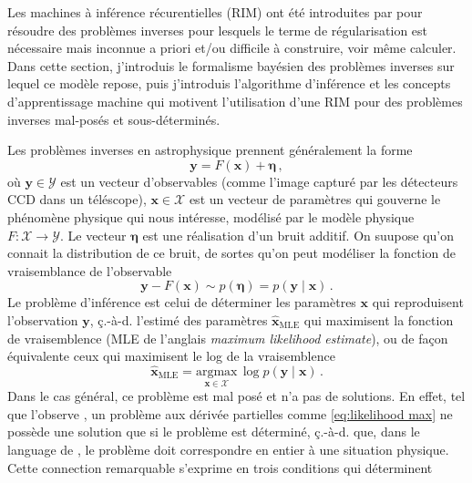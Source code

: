 Les machines à inférence récurentielles (RIM) ont été introduites par \citet{Putzky2017} pour résoudre des problèmes 
inverses pour lesquels le terme de régularisation est nécessaire mais inconnue a priori et/ou difficile à 
construire, voir même calculer. Dans cette section, j'introduis le formalisme bayésien des problèmes inverses sur lequel 
ce modèle repose, puis j'introduis l'algorithme d'inférence et les concepts d'apprentissage machine qui motivent 
l'utilisation d'une RIM pour des problèmes inverses mal-posés et sous-déterminés.

Les problèmes inverses en astrophysique prennent généralement la forme
\begin{equation}\label{eq:inverse problem lineaire}
       \mathbf{y} = F(\mathbf{x}) + \boldsymbol{\eta}\, ,
\end{equation} 
où $\mathbf{y}\in \mathcal{Y}$ est un vecteur d'observables (comme l'image capturé par les détecteurs CCD dans un téléscope), 
$\mathbf{x}\in\mathcal{X}$ est un vecteur de paramètres qui gouverne le phénomène physique qui nous intéresse, 
modélisé par le modèle physique$F:\mathcal{X} \rightarrow \mathcal{Y}$.
Le vecteur $\boldsymbol{\eta}$ est une réalisation d'un bruit additif. 
On suupose qu'on connait la distribution de ce bruit, de sortes qu'on peut modéliser la fonction de vraisemblance de l'observable
\begin{equation}\label{eq:likelihood intro}
        \mathbf{y} - F(\mathbf{x}) \sim p(\boldsymbol{ \eta}) = p(\mathbf{y} \mid \mathbf{x})\, .
\end{equation} 
Le problème d'inférence est celui de déterminer les paramètres $\mathbf{x}$ qui reproduisent l'observation $\mathbf{y}$, 
ç.-à-d. l'estimé des paramètres $\hat{\mathbf{x}}_{\mathrm{MLE}}$ 
qui maximisent la fonction de vraisemblence (MLE de l'anglais \textit{maximum likelihood estimate}), 
ou de façon équivalente ceux qui maximisent le log de la vraisemblence
\begin{equation}\label{eq:likelihood max}
        \hat{\mathbf{x}}_{\mathrm{MLE}} = \underset{\mathbf{x} \in \mathcal{X}}{\mathrm{argmax}}\, \log p(\mathbf{y} \mid \mathbf{x})\, .
\end{equation} 
Dans le cas général, ce problème est mal posé et n'a pas de solutions. En effet, 
tel que l'observe \citet{Hadamard1902}, un problème aux dérivée partielles comme \eqref{eq:likelihood max} 
ne possède une solution que si le problème est déterminé, ç.-à-d. que, dans le language de \citet{Hadamard1902}, 
le problème doit correspondre en entier à une situation physique. Cette connection remarquable s'exprime en trois conditions qui déterminent 
